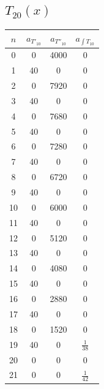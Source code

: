 \documentclass[11pt]{article} %
\begin{document}
\subsection*{$T_{20}(x)$}

\begin{tabular}{| c | c | c | c |}
\hline 
$n$ & $a_{T'_{10}}$ & $a_{T''_{10}}$ & $a_{\int T_{10}}$ \\
\hline \hline
0 & 0 & 4000 & 0\\
1 & 40 & 0 & 0\\
2 & 0& 7920 & 0\\
3 & 40& 0& 0\\
4 & 0 & 7680& 0\\
5 & 40 & 0 & 0\\
6 & 0 & 7280 & 0\\
7 & 40 & 0 & 0\\
8 & 0 & 6720 & 0\\
9 & 40 & 0 & 0\\
10 & 0 & 6000 & 0\\
11 &  40& 0& 0\\
12 &  0& 5120& 0\\
13 &  40& 0& 0\\
14 &  0& 4080& 0\\
15 &  40& 0& 0\\
16 &  0& 2880& 0\\
17 &  40& 0& 0\\
18 &  0& 1520& 0\\
19 &  40& 0&  $\frac{1}{38}$\\
20 &  0& 0& 0\\
21 &  0& 0& $\frac{1}{42}$\\
\hline
\end{tabular}
\end{document}
